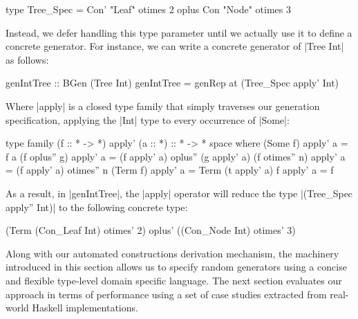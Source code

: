 \begin{code}
type Tree_Spec
  =      Con'  "Leaf"  otimes 2
  oplus  Con   "Node"  otimes 3
\end{code}

Instead, we defer handling this type parameter until we actually use it to
define a concrete generator.
%
For instance, we can write a concrete generator of |Tree Int| as follows:

\begin{code}
genIntTree :: BGen (Tree Int)
genIntTree = genRep at (Tree_Spec apply' Int)
\end{code}

Where |apply| is a closed type family that simply traverses our generation
specification, applying the |Int| type to every occurrence of |Some|:

\begin{code}
type family (f :: * -> *) apply' (a :: *) :: * -> * space where
  (Some f)         apply'  a  = f a
  (f oplus''  g)   apply'  a  = (f apply' a) oplus'' (g apply' a)
  (f otimes'' n)   apply'  a  = (f apply' a) otimes'' n
  (Term f)         apply'  a  = Term (t apply' a)
  f                apply'  a  = f
\end{code}
%
As a result, in |genIntTree|, the |apply| operator will reduce the type
|(Tree_Spec apply'' Int)| to the following concrete type:

\begin{code}
(Term (Con_Leaf Int) otimes' 2) oplus' ((Con_Node Int) otimes' 3)
\end{code}


Along with our automated constructions derivation mechanism, the machinery
introduced in this section allows us to specify random generators using a
concise and flexible type-level domain specific language.
%
The next section evaluates our approach in terms of performance using a set of
case studies extracted from real-world Haskell implementations.
